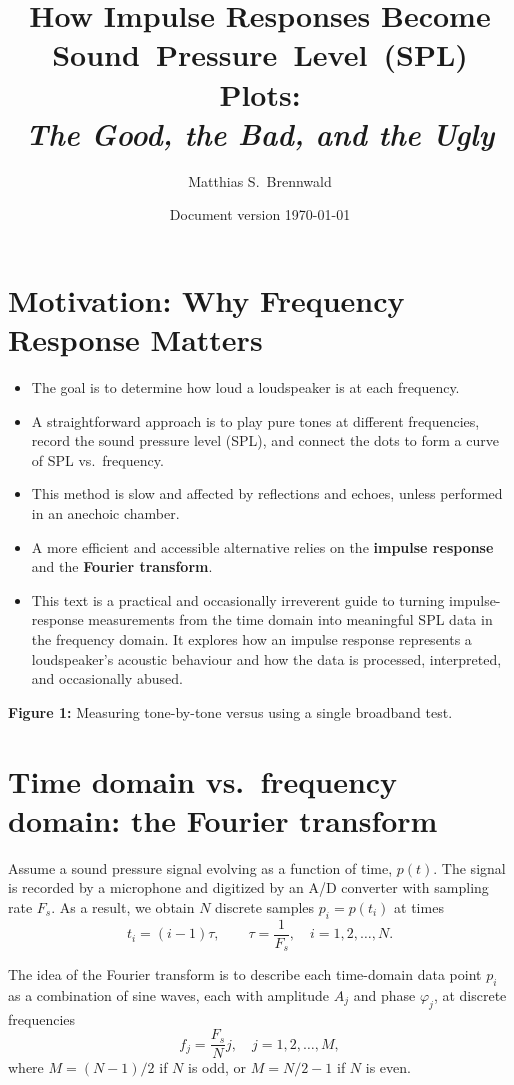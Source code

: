 \documentclass[12pt,a4paper]{article}
\title{How Impulse Responses Become Sound~Pressure~Level~(SPL) Plots:\\[0.7em]\textit{The Good, the Bad, and the Ugly}}
\author{Matthias S.~Brennwald}
\date{Document version \today}
\begin{document}
\maketitle

\section{Motivation: Why Frequency Response Matters}

\begin{itemize}[noitemsep]
    \item The goal is to determine how loud a loudspeaker is at each frequency.
    \item A straightforward approach is to play pure tones at different frequencies, record the sound pressure level (SPL), and connect the dots to form a curve of SPL vs.\ frequency.
    \item This method is slow and affected by reflections and echoes, unless performed in an anechoic chamber.
    \item A more efficient and accessible alternative relies on the \textbf{impulse response} and the \textbf{Fourier transform}.
    \item This text is a practical and occasionally irreverent guide to turning impulse-response measurements from the time domain into meaningful SPL data in the frequency domain. It explores how an impulse response represents a loudspeaker's acoustic behaviour and how the data is processed, interpreted, and occasionally abused.
\end{itemize}

\vspace{1em}
\noindent\textbf{Figure 1:} Measuring tone-by-tone versus using a single broadband test.

\section{Time domain vs.\ frequency domain: the Fourier transform}

Assume a sound pressure signal evolving as a function of time, \(p(t)\).
The signal is recorded by a microphone and digitized by an A/D converter with sampling rate \(F_s\).
As a result, we obtain \(N\) discrete samples \(p_i = p(t_i)\) at times
\[
t_i = (i-1)\tau, \qquad \tau = \frac{1}{F_s}, \quad i = 1, 2, \ldots, N.
\]

The idea of the Fourier transform is to describe each time-domain data point \(p_i\)
as a combination of sine waves, each with amplitude \(A_j\) and phase \(\varphi_j\),
at discrete frequencies
\[
f_j = \frac{F_s}{N}j, \quad j = 1, 2, \ldots, M,
\]
where \(M = (N - 1)/2\) if \(N\) is odd, or \(M = N/2 - 1\) if \(N\) is even.
\end{document}
